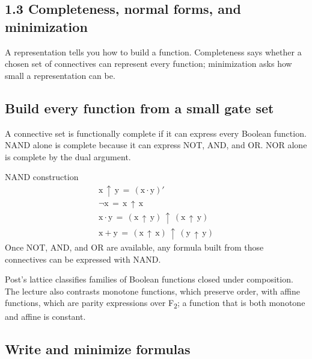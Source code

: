 \documentclass[11pt]{article}
\begin{document}
\begin{keepsection}
\section{1.3 Completeness, normal forms, and minimization}

A representation tells you how to build a function. Completeness says whether a chosen set of connectives can represent every function; minimization asks how small a representation can be.

\begin{keepsection}
\subsection{Build every function from a small gate set}

A connective set is functionally complete if it can express every Boolean function. NAND alone is complete because it can express NOT, AND, and OR. NOR alone is complete by the dual argument.

\begin{equationcard}{NAND construction}
\[ \begin{gathered} \mathrm{x}\, ↑\, \mathrm{y}\, =\, (\mathrm{x}\cdot \mathrm{y})' \\ \neg \mathrm{x}\, =\, \mathrm{x}\, ↑\, \mathrm{x} \\ \mathrm{x}\cdot \mathrm{y}\, =\, (\mathrm{x}\, ↑\, \mathrm{y})\, ↑\, (\mathrm{x}\, ↑\, \mathrm{y}) \\ \mathrm{x}+\mathrm{y}\, =\, (\mathrm{x}\, ↑\, \mathrm{x})\, ↑\, (\mathrm{y}\, ↑\, \mathrm{y}) \end{gathered} \]
{\small Once NOT, AND, and OR are available, any formula built from those connectives can be expressed with NAND.}
\end{equationcard}

Post’s lattice classifies families of Boolean functions closed under composition. The lecture also contrasts monotone functions, which preserve order, with affine functions, which are parity expressions over F\textsubscript{2}; a function that is both monotone and affine is constant.
\end{keepsection}

\begin{keepsection}
\subsection{Write and minimize formulas}


\end{keepsection}
\end{keepsection}
\end{document}
